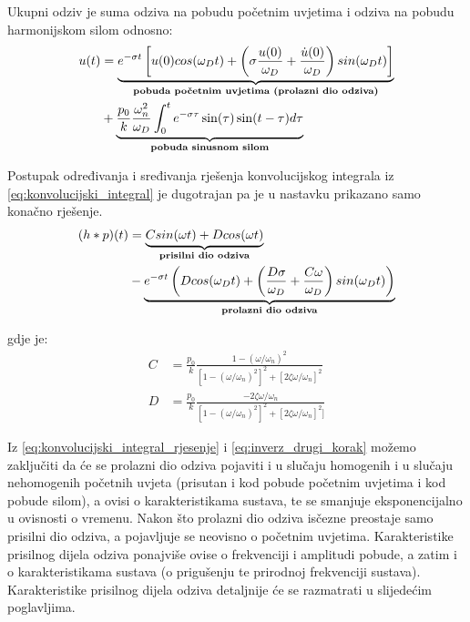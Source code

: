 Ukupni odziv je suma odziva na pobudu početnim uvjetima i odziva na pobudu
harmonijskom silom odnosno:
\begin{equation}
    \begin{split}
    u(t)&=\underbrace{e^{-\sigma t}\left[
		u(0)cos(\omega_Dt)+\left(
                        \sigma\frac{u(0)}{\omega_D}+\frac{\dot{u}(0)}{\omega_D}
                        \right)sin(\omega_Dt) \right]}_{\text{\textbf{pobuda
                    početnim uvjetima (prolazni dio odziva)}}}\\
                    &+\underbrace{
                        \frac{p_0}{k}
                        \frac{\omega_n^2}{\omega_D}
                        \int_0^te^{-\sigma\tau}\sin(\tau)\sin(t-\tau)d\tau
                    }_{\text{\textbf{pobuda sinusnom silom}}}
    \end{split}
    \label{eq:inverz_drugi_korak}
\end{equation}

Postupak određivanja i sređivanja rješenja konvolucijskog integrala iz
\eqref{eq:konvolucijski_integral} je dugotrajan pa je u nastavku prikazano samo konačno 
rješenje.
\begin{equation}
	\begin{split}
	(h*p)(t)&=\underbrace{
			Csin(\omega t)+Dcos(\omega t)
		}_{\text{\textbf{prisilni dio odziva}}}\\
		&-
		\underbrace{
			e^{-\sigma t}
				\left(
				Dcos(\omega_D t) +
					\left(
						\frac{D\sigma}{\omega_D}+\frac{C\omega}{\omega_D}
					\right)
				sin(\omega_Dt)
				\right)
		}_{\text{\textbf{prolazni dio odziva}}}
	\end{split}
    \label{eq:konvolucijski_integral_rjesenje}
\end{equation}

gdje je:
\begin{align}
    C &= \frac{p_0}{k}\frac{1-(\omega/\omega_n)^2}
            {[1-(\omega/\omega_n)^2]^2+[2\zeta\omega/\omega_n]^2}\label{eq:koef_C}\\
    D &= \frac{p_0}{k}\frac{-2\zeta\omega/\omega_n}
            {[1-(\omega/\omega_n)^2]^2+[2\zeta\omega/\omega_n]^2]}\label{eq:koef_D}
\end{align}

Iz \eqref{eq:konvolucijski_integral_rjesenje} i \eqref{eq:inverz_drugi_korak} možemo
zaključiti da će se prolazni dio odziva pojaviti i u slučaju homogenih i u slučaju
nehomogenih početnih uvjeta (prisutan i kod pobude početnim uvjetima i kod pobude
silom), a ovisi o karakteristikama sustava,
te se smanjuje eksponencijalno u ovisnosti o vremenu. Nakon
što prolazni dio odziva isčezne preostaje samo prisilni dio odziva, a pojavljuje se
neovisno o početnim uvjetima. Karakteristike prisilnog dijela odziva ponajviše ovise
o frekvenciji i amplitudi pobude, a zatim i o karakteristikama sustava (o prigušenju
te prirodnoj frekvenciji sustava). Karakteristike prisilnog dijela odziva detaljnije će se
razmatrati u slijedećim poglavljima.
\newpage


